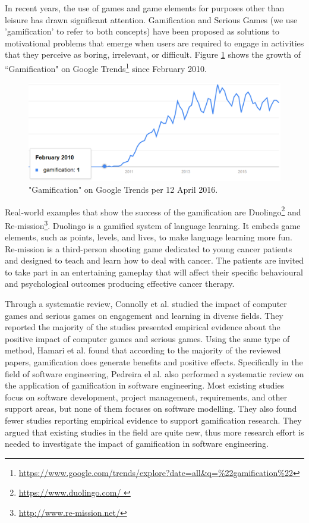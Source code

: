 \documentclass[12pt, a4paper]{report}
\begin{document}
In recent years, the use of games and game elements for purposes other than leisure has drawn significant attention. Gamification \cite{deterding2011game} and Serious Games \cite{Michael2005} (we use 'gamification' to refer to both concepts) have been proposed as solutions to motivational problems that emerge when users are required to engage in activities that they perceive as boring, irrelevant, or difficult. Figure \ref{gamification-trend} shows the growth of ``Gamification" on Google Trends\footnote{\url{https://www.google.com/trends/explore?date=all&q=\%22gamification\%22}} since February 2010. 

\begin{figure}[ht]
\centering
\includegraphics[width=12cm]{gamification-trend}
\caption{"Gamification" on Google Trends per 12 April 2016.}
\label{gamification-trend}
\end{figure}

Real-world examples that show the success of the gamification are Duolingo\footnote{\url{https://www.duolingo.com/
}} and Re-mission\footnote{\url{http://www.re-mission.net/}}. Duolingo is a gamified system of language learning. It embeds game elements, such as points, levels, and lives, to make language learning more fun. Re-mission is a third-person shooting game dedicated to young cancer patients and designed to teach and learn how to deal with cancer. The patients are invited to take part in an entertaining gameplay that will affect their specific behavioural and psychological outcomes producing effective cancer therapy.
 
Through a systematic review, Connolly et al. \cite{connolly2012systematic} studied the impact of computer games and serious games on engagement and learning in diverse fields. They reported the majority of the studies presented empirical evidence about the positive impact of computer games and serious games. Using the same type of method, Hamari et al. \cite{hamari2014does} found that according to the majority of the reviewed papers, gamification does generate benefits and positive effects. Specifically in the field of software engineering, Pedreira el al. \cite{Pedreira2015} also performed a systematic review on the application of gamification in software engineering. Most existing studies focus on software development, project management, requirements, and other support areas, but none of them focuses on software modelling. They also found fewer studies reporting empirical evidence to support gamification research. They argued that existing studies in the field are quite new, thus more research effort is needed to investigate the impact of gamiﬁcation in software engineering. 
\end{document}
